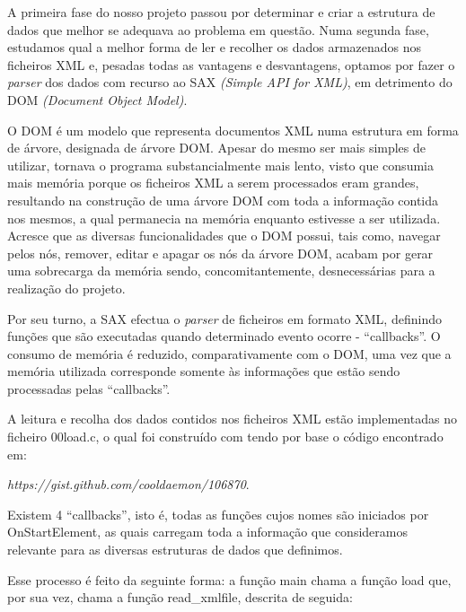 \documentclass[a4paper]{report}
\begin{document}
A primeira fase do nosso projeto passou por determinar e criar a estrutura de dados
que melhor se adequava ao problema em questão.
Numa segunda fase, estudamos qual a melhor forma de ler e recolher os dados armazenados
nos ficheiros XML e, pesadas todas as vantagens e desvantagens, optamos por fazer o
\textit{parser} dos dados com recurso ao SAX \textit{(Simple API for XML)},
em detrimento do DOM \textit{(Document Object Model)}. \par
O DOM é um modelo que representa documentos XML numa estrutura
em forma de árvore, designada de árvore DOM. Apesar do mesmo ser mais simples de utilizar,
tornava o programa substancialmente mais lento, visto que consumia mais memória porque os ficheiros
XML a serem processados eram grandes, resultando na construção de uma árvore DOM com toda a informação
contida nos mesmos, a qual permanecia na memória enquanto estivesse a ser utilizada. Acresce que
as diversas funcionalidades que o DOM possui, tais como, navegar pelos nós, remover, editar e apagar
os nós da árvore DOM, acabam por gerar uma sobrecarga da memória sendo, concomitantemente,
desnecessárias para a realização do projeto. \par
Por seu turno, a SAX efectua o \textit{parser} de ficheiros em formato XML, definindo
funções que são executadas quando determinado evento ocorre - ``callbacks''. O consumo de memória
é reduzido, comparativamente com o DOM, uma vez que a memória utilizada corresponde somente às
informações que estão sendo processadas pelas ``callbacks''. \par

A leitura e recolha dos dados contidos nos ficheiros XML estão implementadas no
ficheiro 00load.c, o qual foi construído com tendo por base o código encontrado em:
\begin{center}
\emph{https://gist.github.com/cooldaemon/106870}.
\end{center}

Existem 4 ``callbacks'', isto é, todas as funções cujos nomes são
iniciados por OnStartElement, as quais carregam toda a informação que consideramos
relevante para as diversas estruturas de dados que definimos. \par
Esse processo é feito da seguinte forma: a função main chama a função load que,
por sua vez, chama a função read\_xmlfile, descrita de seguida:
\end{document}
